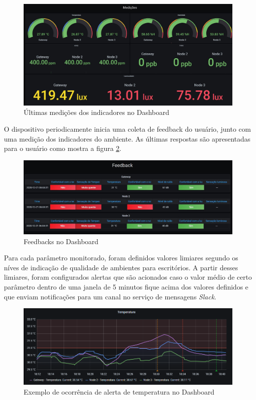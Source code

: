 \documentclass[../monografia.tex]{subfiles}
\begin{document}
\begin{figure}[h]
	\centering
	\includegraphics[width=\textwidth]{dashboard-medicoes}
	\caption{Últimas medições dos indicadores no Dashboard}
	\label{fig:dashboard-medicoes}
\end{figure}

\newpage
O dispositivo periodicamente inicia uma coleta de feedback do usuário, junto com uma medição dos indicadores do ambiente. As últimas respostas são apresentadas para o usuário como mostra a figura \ref{fig:dashboard-feedback}. 

\begin{figure}[h]
	\centering
	\includegraphics[width=\textwidth]{dashboard-feedback}
	\caption{Feedbacks no Dashboard}
	\label{fig:dashboard-feedback}
\end{figure}

Para cada parâmetro monitorado, foram definidos valores limiares segundo os níves de indicação de qualidade de ambientes para escritórios. A partir desses limiares, foram configurados alertas que são acionados caso o valor médio de certo parâmetro dentro de uma janela de 5 minutos fique acima dos valores definidos e que enviam notificações para um canal no serviço de mensagens \textit{Slack}.    

\begin{figure}[h!]
	\centering
	\includegraphics[width=\textwidth]{grafana-temperature-alert.png}
	\caption{Exemplo de ocorrência de alerta de temperatura no Dashboard}
	\label{fig:dashboard-alerta}
\end{figure}
\end{document}
